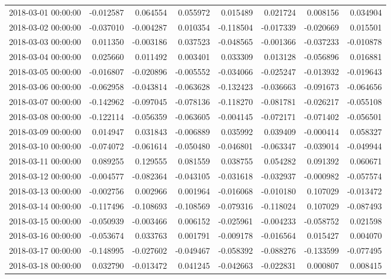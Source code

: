 \begin{tabular}{lrrrrrrr}
2018-03-01 00:00:00 & -0.012587 & 0.064554 & 0.055972 & 0.015489 & 0.021724 & 0.008156 & 0.034904 \\
2018-03-02 00:00:00 & -0.037010 & -0.004287 & 0.010354 & -0.118504 & -0.017339 & -0.020669 & 0.015501 \\
2018-03-03 00:00:00 & 0.011350 & -0.003186 & 0.037523 & -0.048565 & -0.001366 & -0.037233 & -0.010878 \\
2018-03-04 00:00:00 & 0.025660 & 0.011492 & 0.003401 & 0.033309 & 0.013128 & -0.056896 & 0.016881 \\
2018-03-05 00:00:00 & -0.016807 & -0.020896 & -0.005552 & -0.034066 & -0.025247 & -0.013932 & -0.019643 \\
2018-03-06 00:00:00 & -0.062958 & -0.043814 & -0.063628 & -0.132423 & -0.036663 & -0.091673 & -0.064656 \\
2018-03-07 00:00:00 & -0.142962 & -0.097045 & -0.078136 & -0.118270 & -0.081781 & -0.026217 & -0.055108 \\
2018-03-08 00:00:00 & -0.122114 & -0.056359 & -0.063605 & -0.004145 & -0.072171 & -0.071402 & -0.056501 \\
2018-03-09 00:00:00 & 0.014947 & 0.031843 & -0.006889 & 0.035992 & 0.039409 & -0.000414 & 0.058327 \\
2018-03-10 00:00:00 & -0.074072 & -0.061614 & -0.050480 & -0.046801 & -0.063347 & -0.039014 & -0.049944 \\
2018-03-11 00:00:00 & 0.089255 & 0.129555 & 0.081559 & 0.038755 & 0.054282 & 0.091392 & 0.060671 \\
2018-03-12 00:00:00 & -0.004577 & -0.082364 & -0.043105 & -0.031618 & -0.032937 & -0.000982 & -0.057574 \\
2018-03-13 00:00:00 & -0.002756 & 0.002966 & 0.001964 & -0.016068 & -0.010180 & 0.107029 & -0.013472 \\
2018-03-14 00:00:00 & -0.117496 & -0.108693 & -0.108569 & -0.079316 & -0.118024 & 0.107029 & -0.087493 \\
2018-03-15 00:00:00 & -0.050939 & -0.003466 & 0.006152 & -0.025961 & -0.004233 & -0.058752 & 0.021598 \\
2018-03-16 00:00:00 & -0.053674 & 0.033763 & 0.001791 & -0.009178 & -0.016564 & 0.015427 & 0.004070 \\
2018-03-17 00:00:00 & -0.148995 & -0.027602 & -0.049467 & -0.058392 & -0.088276 & -0.133599 & -0.077495 \\
2018-03-18 00:00:00 & 0.032790 & -0.013472 & 0.041245 & -0.042663 & -0.022831 & 0.000807 & 0.008415 \\

\end{tabular}
